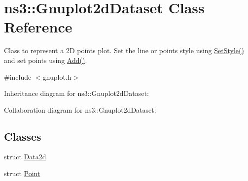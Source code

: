 \hypertarget{classns3_1_1Gnuplot2dDataset}{}\section{ns3\+:\+:Gnuplot2d\+Dataset Class Reference}
\label{classns3_1_1Gnuplot2dDataset}


Class to represent a 2D points plot. Set the line or points style using \hyperlink{classns3_1_1Gnuplot2dDataset_a7a3d6b6c2bd7d32a82f5715bae37c886}{Set\+Style()} and set points using \hyperlink{classns3_1_1Gnuplot2dDataset_abd93f7c8fa2d1ed643c09d7fb8d5ef27}{Add()}.  




{\ttfamily \#include $<$gnuplot.\+h$>$}



Inheritance diagram for ns3\+:\+:Gnuplot2d\+Dataset\+:


Collaboration diagram for ns3\+:\+:Gnuplot2d\+Dataset\+:
\subsection*{Classes}
\begin{DoxyCompactItemize}
\item 
struct \hyperlink{structns3_1_1Gnuplot2dDataset_1_1Data2d}{Data2d}
\item 
struct \hyperlink{structns3_1_1Gnuplot2dDataset_1_1Point}{Point}
\end{DoxyCompactItemize}
